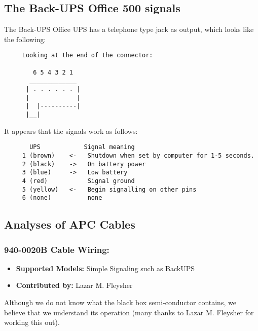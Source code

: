 \subsection*{The Back-UPS Office 500 signals}

The Back-UPS Office UPS has a telephone type jack as output, which looks like
the following: 

\footnotesize
\begin{verbatim}
     Looking at the end of the connector:
     
        6 5 4 3 2 1
       _____________
      | . . . . . . |
      |             |
      |  |----------|
      |__|
\end{verbatim}
\normalsize

It appears that the signals work as follows: 

\footnotesize
\begin{verbatim}
       UPS            Signal meaning
     1 (brown)    <-   Shutdown when set by computer for 1-5 seconds.
     2 (black)    ->   On battery power
     3 (blue)     ->   Low battery
     4 (red)           Signal ground
     5 (yellow)   <-   Begin signalling on other pins
     6 (none)          none
\end{verbatim}
\normalsize

\subsection*{Analyses of APC Cables}

\subsubsection*{940-0020B Cable Wiring:}

\begin{itemize}
\item {\bf Supported Models:} Simple Signaling such as BackUPS
\item {\bf Contributed by:} Lazar M. Fleysher
\end{itemize}

Although we do
not know what the black box semi-conductor contains, we believe that we
understand its operation (many thanks to Lazar M. Fleysher for working this
out).  


